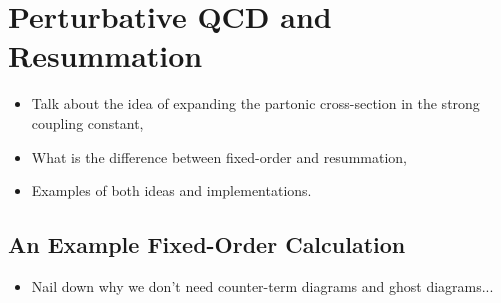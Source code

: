 \section{Perturbative QCD and Resummation}

	{\color{red}
	\begin{itemize}
		\item Talk about the idea of expanding the partonic cross-section in the strong coupling constant,
		\item What is the difference between fixed-order and resummation,
		\item Examples of both ideas and implementations.
	\end{itemize}
	}

	\subsection{An Example Fixed-Order Calculation}

	{\color{red}
	\begin{itemize}
		\item Nail down why we don't need counter-term diagrams and ghost diagrams...
	\end{itemize}
	}

